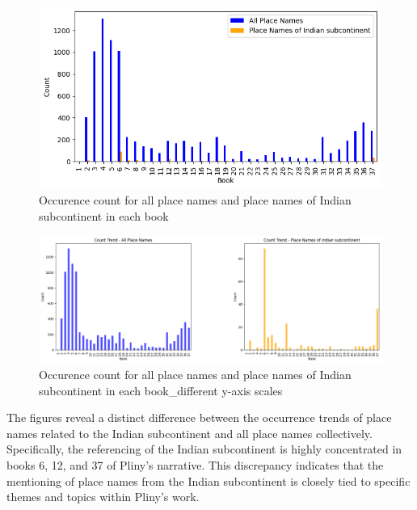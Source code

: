 \documentclass[
  12pt,
]{article}
\begin{document}
\begin{figure}[H]

{\centering \includegraphics{NHthesis_0728_files/figure-pdf/fig-grouped_place_name_count_comparison-output-1.png}

}

\caption{\label{fig-grouped_place_name_count_comparison}Occurence count
for all place names and place names of Indian subcontinent in each book}

\end{figure}

\begin{figure}[H]

{\centering \includegraphics{NHthesis_0728_files/figure-pdf/fig-subplots_place_name_count_comparison-output-1.png}

}

\caption{\label{fig-subplots_place_name_count_comparison}Occurence count
for all place names and place names of Indian subcontinent in each
book\_different y-axis scales}

\end{figure}

The figures reveal a distinct difference between the occurrence trends
of place names related to the Indian subcontinent and all place names
collectively. Specifically, the referencing of the Indian subcontinent
is highly concentrated in books 6, 12, and 37 of Pliny's narrative. This
discrepancy indicates that the mentioning of place names from the Indian
subcontinent is closely tied to specific themes and topics within
Pliny's work.
\end{document}
